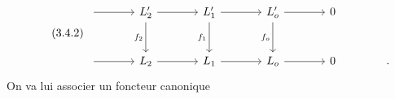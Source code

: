 \begin{equation}\tag{3.4.2}
\begin{tikzcd}[column sep=large, row sep=large]
{} \arrow[r] & L'_2 \arrow[r] \arrow[d, "f_2"'] & L'_1 \arrow[r] \arrow[d, "f_1"'] & L'_o \arrow[r] \arrow[d, "f_o"'] & 0 \\
{} \arrow[r] & L_2 \arrow[r] & L_1 \arrow[r] & L_o \arrow[r] & 0 & .
\end{tikzcd}
\end{equation}
On va lui associer un foncteur canonique


